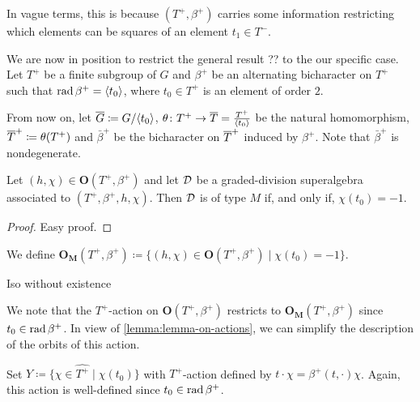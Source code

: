 In vague terms, this is because $(T^+, \beta^+)$ carries some information restricting which elements can be squares of an element $t_1 \in T^-$. 

We are now in position to restrict the general result ?? to the our specific case. 
Let $T^+$ be a finite subgroup of $G$ and $\beta^+$ be an alternating bicharacter on $T^+$ such that $\operatorname{rad} \beta^+ = \langle t_0 \rangle$, where $t_0\in T^+$ is an element of order $2$. 


From now on, let $\barr G \coloneqq G/\langle t_0 \rangle$, $\theta\from T^+\rightarrow \barr T=\frac{T^+}{\langle t_0 \rangle}$ be the natural homomorphism, $\barr T^+ \coloneqq \theta(T^+)$ and $\bar\beta^+$ be the bicharacter on $\barr T^+$ induced by $\beta^+$. 
Note that $\bar\beta^+$ is nondegenerate.

\begin{lemma}\label{lemma:motivation-O_M}
    Let $(h, \chi) \in \mathbf{O}(T^+, \beta^+)$ and let $\mathcal{D}$ be a graded-division superalgebra associated to $(T^+, \beta^+, h, \chi)$. 
    Then $\mathcal{D}$ is of type $M$ if, and only if, $\chi(t_0) = -1$.
\end{lemma}

\begin{proof}
    Easy proof.
\end{proof}

\begin{defi}
    We define $\mathbf{O_M}(T^+, \beta^+) \coloneqq \{ (h, \chi) \in \mathbf{O}(T^+, \beta^+) \mid \chi(t_0) = -1 \}$.
\end{defi}

\begin{cor}
    Iso without existence
\end{cor}

We note that the $T^+$-action on $\mathbf{O}(T^+, \beta^+)$ restricts to $\mathbf{O_M}(T^+, \beta^+)$ since $t_0\in \operatorname{rad} \beta^+$. 
In view of \cref{lemma:lemma-on-actions}, we can simplify the description of the orbits of this action. 

Set $Y \coloneqq \{\chi \in \widehat{T^+} \mid \chi (t_0)\}$ with $T^+$-action defined by $t\cdot \chi = \beta^+(t, \cdot) \chi$. 
Again, this action is well-defined since $t_0 \in \operatorname{rad} \beta^+$. 

